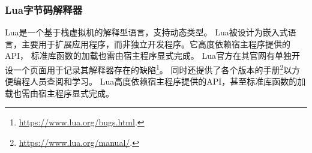 		\subsubsection{Lua字节码解释器}
		Lua是一个基于栈虚拟机的解释型语言，支持动态类型\cite{ierusalimschyLua54Reference2020}。
		Lua被设计为嵌入式语言，主要用于扩展应用程序，而非独立开发程序。它高度依赖宿主程序提供的API，
		标准库函数的加载也需由宿主程序显式完成\cite{SecurityLuaSandbox2022}。
		Lua官方在其官网有单独开设一个页面用于记录其解释器存在的缺陷\footnote{\url{https://www.lua.org/bugs.html}.}。
		同时还提供了各个版本的手册\footnote{\url{https://www.lua.org/manual/}.}以方便编程人员查阅和学习。
		Lua高度依赖宿主程序提供的API，甚至标准库函数的加载也需由宿主程序显式完成\cite{ierusalimschyProgrammingLua532016}。